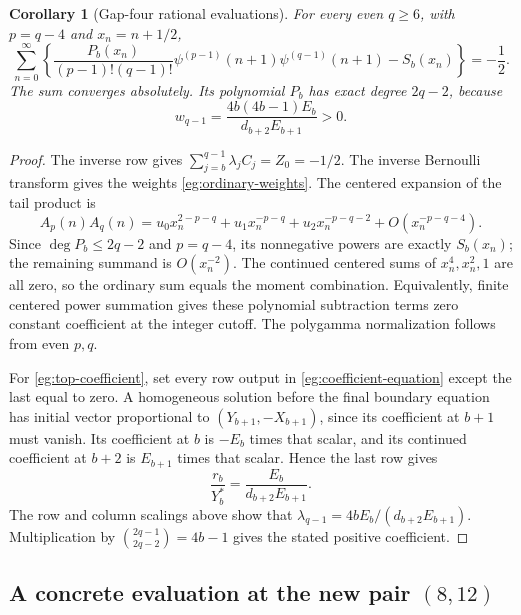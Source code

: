 \documentclass[11pt]{article}
\newtheorem{corollary}[theorem]{Corollary}
\theoremstyle{definition}
\theoremstyle{remark}
\numberwithin{equation}{section}
\begin{document}
\begin{corollary}[Gap-four rational evaluations]\label{eg:ordinary-family}
For every even $q\ge6$, with $p=q-4$ and $x_n=n+1/2$,
\begin{equation}\label{eg:ordinary-family-equation}
 \boxed{\displaystyle
 \sum_{n=0}^{\infty}\left\{
 \frac{P_b(x_n)}{(p-1)!(q-1)!}
   \psi^{(p-1)}(n+1)\psi^{(q-1)}(n+1)-S_b(x_n)
                  \right\}=-\frac12.}
\end{equation}
The sum converges absolutely. Its polynomial $P_b$ has exact degree
$2q-2$, because
\begin{equation}\label{eg:top-coefficient}
 w_{q-1}=\frac{4b(4b-1)E_b}{d_{b+2}E_{b+1}}>0.
\end{equation}
\end{corollary}

\begin{proof}
The inverse row gives $\sum_{j=b}^{q-1}\lambda_jC_j=Z_0=-1/2$.
The inverse Bernoulli transform gives the weights
\eqref{eg:ordinary-weights}. The centered expansion of the tail product
is
\[
 A_p(n)A_q(n)=u_0x_n^{2-p-q}+u_1x_n^{-p-q}
                         +u_2x_n^{-p-q-2}+O(x_n^{-p-q-4}).
\]
Since $\deg P_b\le2q-2$ and $p=q-4$, its nonnegative powers are
exactly $S_b(x_n)$; the remaining summand is $O(x_n^{-2})$.
The continued centered sums of $x_n^4,x_n^2,1$ are all zero,
so the ordinary sum equals the moment combination. Equivalently,
finite centered power summation gives these polynomial subtraction
terms zero constant coefficient at the integer cutoff. The polygamma
normalization follows from even $p,q$.

For \eqref{eg:top-coefficient}, set every row output in
\eqref{eg:coefficient-equation} except the last equal to zero.
A homogeneous solution before the final boundary equation has initial
vector proportional to $(Y_{b+1},-X_{b+1})$, since its coefficient
at $b+1$ must vanish. Its coefficient at $b$ is $-E_b$ times that
scalar, and its continued coefficient at $b+2$ is $E_{b+1}$ times
that scalar. Hence the last row gives
\[
        \frac{r_b}{Y_b^*}=\frac{E_b}{d_{b+2}E_{b+1}}.
\]
The row and column scalings above show that
$\lambda_{q-1}=4bE_b/(d_{b+2}E_{b+1})$. Multiplication by
$\binom{2q-1}{2q-2}=4b-1$ gives the stated positive coefficient.
\end{proof}

\subsection{A concrete evaluation at the new pair \texorpdfstring{$(8,12)$}{(8,12)}}
\end{document}
